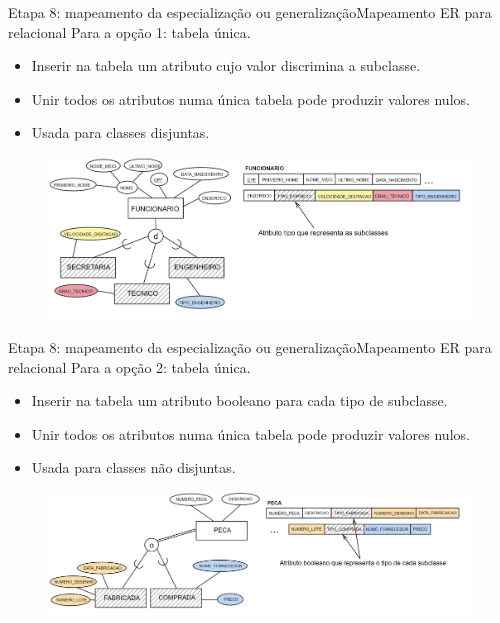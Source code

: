 \documentclass[t]{beamer}
\begin{document}

\begin{ftst}{Etapa 8: mapeamento da especialização ou generalização}{Mapeamento ER para relacional}
\small
Para a opção 1: tabela única.
\begin{itemize}
    \item Inserir na tabela um atributo cujo valor discrimina a subclasse.
    \item Unir todos os atributos numa única tabela pode produzir valores nulos. 
    \item Usada para classes disjuntas.
\end{itemize}
\begin{figure}
    \centering
    \includegraphics[scale=0.11]{Figuras/03_13.png}
\end{figure}
\end{ftst}


\begin{ftst}{Etapa 8: mapeamento da especialização ou generalização}{Mapeamento ER para relacional}
\small
Para a opção 2: tabela única.
\begin{itemize}
    \item Inserir na tabela um atributo booleano para cada tipo de subclasse.
    \item Unir todos os atributos numa única tabela pode produzir valores nulos. 
    \item Usada para classes não disjuntas.
\end{itemize}
\begin{figure}
    \centering
    \includegraphics[scale=0.11]{Figuras/03_14.png}
\end{figure}
\end{ftst}
\end{document}
